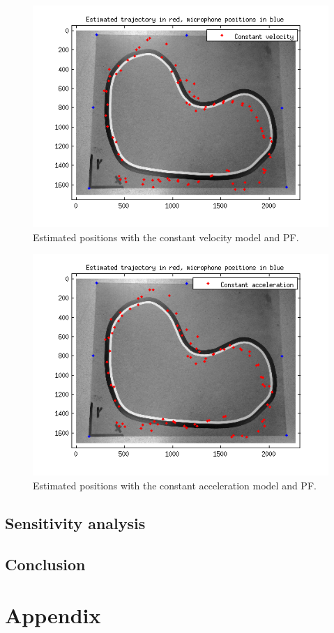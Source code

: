 \documentclass[10pt,a4paper]{report}
\begin{document}
\begin{figure}[H]
\begin{center}
  \includegraphics[width = 350pt]{pf_CV.png}
  \caption{Estimated positions with the constant velocity model and PF.}
  \label{pf_CV}
  \end{center}
\end{figure}
\begin{figure}[H]
\begin{center}
  \includegraphics[width = 350pt]{pf_CA.png}
  \caption{Estimated positions with the constant acceleration model and PF.}
  \label{pf_CA}
  \end{center}
\end{figure}
\newpage
\section{Sensitivity analysis}
\label{Sensitivity analysis}

\newpage
\section{Conclusion}
\label{Conclusion}

\chapter{Appendix}
\end{document}
